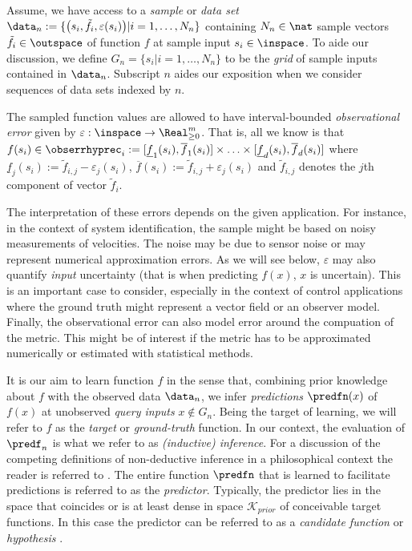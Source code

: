 Assume, we have access to a \textit{sample} or \textit{data set} $\data_n:= \{\bigl( s_i, \tilde f_i, \varepsilon(s_i) \bigr) \vert i=1,\ldots, N_n \} $ containing $N_n \in \nat$ sample vectors $\tilde f_i \in \outspace$ of function $f$ at sample input $s_i \in \inspace$. To aide our discussion, we define $G_n =\{s_i | i =1,\ldots,N_n\}$ to be the \textit{grid} of sample inputs contained in $\data_n$. Subscript $n$ aides our exposition when we consider sequences of data sets indexed by $n$.

The sampled function values are allowed to have interval-bounded \textit{observational error} given by $\varepsilon : \inspace \to \Real^m_{\geq 0}$. That is, all we know is that $f(s_i) \in \obserrhyprec_i := [\underline f_1(s_i), \overline f_1(s_i) ] \times \ldots \times [\underline f_d(s_i), \overline f_d(s_i) ]$ where $\underline f_j(s_i) := \tilde f_{i,j} - \varepsilon_j(s_i)$, $\overline f(s_i) := \tilde f_{i,j} + \varepsilon_j(s_i)$ and $\tilde f_{i,j}$ denotes the $j$th component of vector $\tilde f_{i}$.

The interpretation of these errors depends on the given application. For instance, in the context of system identification, the sample might be based on noisy measurements of velocities. The noise may be due to sensor noise or may represent numerical approximation errors. As we will see below, $\varepsilon$ may also quantify \textit{input} uncertainty (that is when predicting $f(x)$, $x$ is uncertain). This is an important case to consider, especially in the context of control applications where the ground truth might represent a vector field or an observer model. Finally, the observational error can also model error around the compuation of the metric. This might be of interest if the metric has to be approximated numerically or estimated with statistical methods. 


It is our aim to learn function $f$ in the sense that, combining prior knowledge about $f$ with the observed data $\data_n$, we infer \textit{predictions} $\predfn(x)$ of $f(x)$ at unobserved \textit{query inputs} $x \notin G_n$. Being the target of learning, we will refer to $f$ as the \emph{target} or \emph{ground-truth} function. In our context, the evaluation of $\predf_n$ is what we refer to as \textit{(inductive) inference}. For a discussion of the competing definitions of non-deductive inference in a philosophical context the reader is referred to \cite{Flach2000}. The entire function $\predfn$ that is learned to facilitate predictions is referred to as the \textit{predictor}. Typically,
the predictor lies in the space that coincides or is at least dense in space $\mathcal K_{prior}$ of conceivable target functions. In this case the predictor can be referred to as a \textit{candidate function} or \textit{hypothesis} \cite{mitchellbook:97}.

